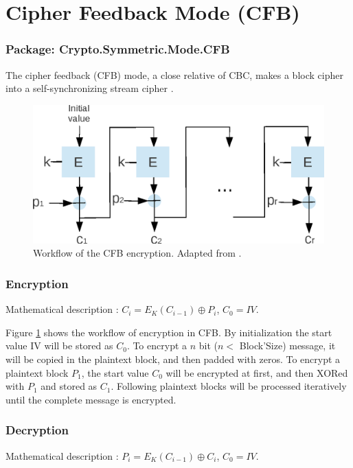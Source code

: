 \section{Cipher Feedback Mode (CFB)}\label{CipherFeedbackMode}
\subsubsection*{Package: Crypto.Symmetric.Mode.CFB}
The cipher feedback (CFB) mode, a close relative of CBC, makes a block
cipher into a self-synchronizing stream cipher
\cite{DBLP:reference/crypt/2011}.
\begin{figure}[htp]
\center
\includegraphics[scale=0.8]{./images/CFB_En}
\caption{Workflow of the CFB encryption. Adapted from
  \cite{DBLP:reference/crypt/2011}.}\label{CFBEN} \center
\end{figure}

\subsubsection*{Encryption}
Mathematical description : $C_i=E_K(C_{i-1})\oplus P_i$,
$C_0=IV$.

Figure \ref{CFBEN} shows the workflow of encryption in CFB. By
initialization the start value IV will be stored as $C_0$. To encrypt
a $n$ bit ($n<$ Block'Size) message, it will be copied in the
plaintext block, and then padded with zeros. To encrypt a plaintext
block $P_1$, the start value $C_0$ will be encrypted at first, and
then XORed with $P_1$ and stored as $C_1$. Following plaintext blocks
will be processed iteratively until the complete message is encrypted.

\subsubsection*{Decryption}
Mathematical description : $P_i=E_K(C_{i-1})\oplus C_i$,
$C_0=IV$.

